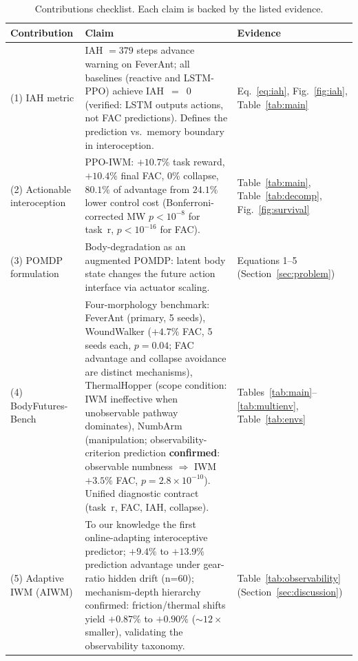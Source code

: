 \documentclass{article}
\begin{document}
{\begin{table}[H]
\centering
\caption{Contributions checklist.  Each claim is backed by the listed evidence.}
\label{tab:contributions}
\setlength{\tabcolsep}{4pt}
\small
\begin{tabular}{lp{6.8cm}p{3.6cm}}
\toprule
\textbf{Contribution} & \textbf{Claim} & \textbf{Evidence} \\
\midrule
(1) IAH metric &
  IAH $= 379$ steps advance warning on FeverAnt; all baselines (reactive and LSTM-PPO) achieve IAH~$=$~0 (verified: LSTM outputs actions, not FAC predictions).
  Defines the prediction vs.\ memory boundary in interoception. &
  Eq.~\ref{eq:iah}, Fig.~\ref{fig:iah}, Table~\ref{tab:main} \\
\addlinespace[2pt]
(2) Actionable interoception &
  PPO-IWM: $+10.7\%$ task reward, $+10.4\%$ final FAC, 0\%
  collapse, $80.1\%$ of advantage from $24.1\%$ lower control cost
  (Bonferroni-corrected MW $p < 10^{-8}$ for task~r, $p < 10^{-16}$ for FAC). &
  Table~\ref{tab:main}, Table~\ref{tab:decomp},
  Fig.~\ref{fig:survival} \\
\addlinespace[2pt]
(3) POMDP formulation &
  Body-degradation as an augmented POMDP: latent body state changes the
  future action interface via actuator scaling. &
  Equations 1--5 (Section~\ref{sec:problem}) \\
\addlinespace[2pt]
(4) BodyFutures-Bench &
  Four-morphology benchmark: FeverAnt (primary, 5 seeds), WoundWalker ($+4.7\%$ FAC, 5 seeds each, $p\!=\!0.04$; FAC advantage and collapse avoidance are distinct mechanisms), ThermalHopper (scope condition: IWM ineffective when unobservable pathway dominates), NumbArm (manipulation; observability-criterion prediction \textbf{confirmed}: observable numbness $\Rightarrow$ IWM $+3.5\%$ FAC, $p\!=\!2.8{\times}10^{-10}$).
  Unified diagnostic contract (task~r, FAC, IAH, collapse). &
  Tables~\ref{tab:main}--\ref{tab:multienv}, Table~\ref{tab:envs} \\
\addlinespace[2pt]
(5) Adaptive IWM (AIWM) &
  To our knowledge the first online-adapting interoceptive predictor; $+9.4\%$ to $+13.9\%$ prediction advantage under gear-ratio hidden drift (n=60); mechanism-depth hierarchy confirmed: friction/thermal shifts yield $+0.87\%$ to $+0.90\%$ (${\sim}12{\times}$ smaller), validating the observability taxonomy. &
  Table~\ref{tab:observability} (Section~\ref{sec:discussion}) \\
\bottomrule
\end{tabular}
\end{table}

}
\end{document}
